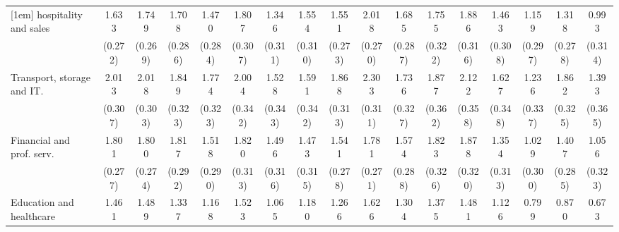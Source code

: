 {\begin{tabular}{l*{16}{c}}
[1em]
hospitality and sales&       1.633\sym{***}&       1.749\sym{***}&       1.708\sym{***}&       1.470\sym{***}&       1.807\sym{***}&       1.346\sym{***}&       1.554\sym{***}&       1.551\sym{***}&       2.018\sym{***}&       1.685\sym{***}&       1.755\sym{***}&       1.886\sym{***}&       1.463\sym{***}&       1.159\sym{***}&       1.318\sym{***}&       0.993\sym{**} \\
                    &     (0.272)         &     (0.269)         &     (0.286)         &     (0.284)         &     (0.307)         &     (0.311)         &     (0.310)         &     (0.273)         &     (0.270)         &     (0.287)         &     (0.322)         &     (0.316)         &     (0.308)         &     (0.297)         &     (0.278)         &     (0.314)         \\
[1em]
Transport, storage and IT.&       2.013\sym{***}&       2.018\sym{***}&       1.849\sym{***}&       1.774\sym{***}&       2.004\sym{***}&       1.528\sym{***}&       1.591\sym{***}&       1.868\sym{***}&       2.303\sym{***}&       1.736\sym{***}&       1.877\sym{***}&       2.122\sym{***}&       1.627\sym{***}&       1.236\sym{***}&       1.862\sym{***}&       1.393\sym{***}\\
                    &     (0.307)         &     (0.303)         &     (0.323)         &     (0.323)         &     (0.342)         &     (0.343)         &     (0.342)         &     (0.313)         &     (0.311)         &     (0.327)         &     (0.362)         &     (0.358)         &     (0.348)         &     (0.337)         &     (0.325)         &     (0.365)         \\
[1em]
Financial and prof. serv.&       1.801\sym{***}&       1.800\sym{***}&       1.817\sym{***}&       1.518\sym{***}&       1.820\sym{***}&       1.496\sym{***}&       1.473\sym{***}&       1.541\sym{***}&       1.781\sym{***}&       1.574\sym{***}&       1.823\sym{***}&       1.878\sym{***}&       1.354\sym{***}&       1.029\sym{***}&       1.407\sym{***}&       1.056\sym{**} \\
                    &     (0.277)         &     (0.274)         &     (0.292)         &     (0.290)         &     (0.313)         &     (0.316)         &     (0.315)         &     (0.278)         &     (0.271)         &     (0.288)         &     (0.326)         &     (0.320)         &     (0.313)         &     (0.300)         &     (0.285)         &     (0.323)         \\
[1em]
Education and healthcare&       1.461\sym{***}&       1.489\sym{***}&       1.337\sym{***}&       1.168\sym{***}&       1.523\sym{***}&       1.065\sym{***}&       1.180\sym{***}&       1.266\sym{***}&       1.626\sym{***}&       1.304\sym{***}&       1.375\sym{***}&       1.481\sym{***}&       1.126\sym{***}&       0.799\sym{**} &       0.870\sym{**} &       0.673\sym{*}  \\

\end{tabular}}
